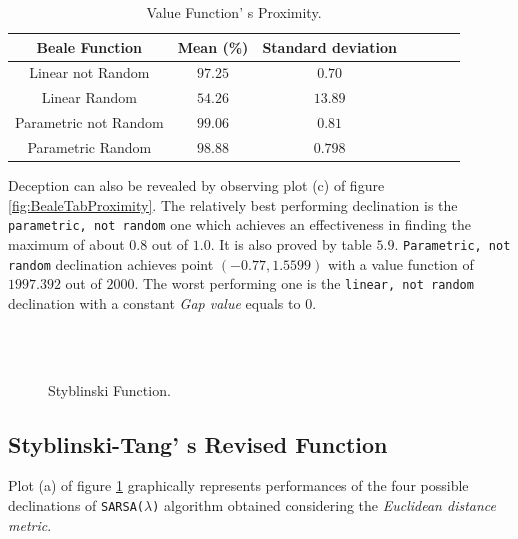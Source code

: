 \begin{table}[h!]
	\centering
	\resizebox{\linewidth}{!} {
		\begin{tabular}{c| cccccc} 
			\hline \textbf{Beale Function}
			& \textbf{Mean (\%)} & \textbf{Standard deviation} \\ 
			\hline Linear not Random
			& $97.25$ & \cellcolor{green!25}$0.70$\\ 
			\hline Linear Random
			& $54.26$ & $13.89$\\ 
			\hline Parametric not Random
			& \cellcolor{green!25}$99.06$ & $0.81$ \\ 
			\hline Parametric Random
			& $98.88$ & $0.798$ \\ 
			\hline 
		\end{tabular} 
}
	\label{BealeTabProximity}
	\caption{Value Function' s Proximity.} 
\end{table}

Deception can also be revealed by observing plot (c) of figure \ref{fig:BealeTabProximity}. The relatively best performing declination is the {\tt parametric, not random} one which achieves an effectiveness in finding the maximum of about $0.8$ out of $1.0$. It is also proved by table $5.9$. {\tt Parametric, not random} declination achieves point $(-0.77, 1.5599)$ with a value function of $1997.392$ out of $2000$. The worst performing one is the {\tt linear, not random} declination with a constant \textit{Gap value} equals to $0$.

\begin{figure}[h!]
	\begin{center}
		\\
		 \\
		
	\end{center}
	\caption{
		Styblinski Function.
	}
	\label{fig:StyblinskiResults}
\end{figure}

\subsection{Styblinski-Tang' s Revised Function} Plot (a) of figure \ref{fig:StyblinskiResults} graphically represents performances of the four possible declinations of {\tt SARSA($\lambda$)} algorithm obtained considering the \textit{Euclidean distance metric}. 

